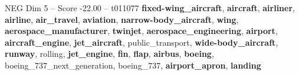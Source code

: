 \begin{textsample}{NEG Dim 5 – Score -22.00 – t011077}  \label{ex:f5_neg_007}
\textbf{fixed-wing\_aircraft}, \textbf{aircraft}, \textbf{airliner}, \textbf{airline}, \textbf{air\_travel}, \textbf{aviation}, \textbf{narrow-body\_aircraft}, \textbf{wing}, \textbf{aerospace\_manufacturer}, \textbf{twinjet}, \textbf{aerospace\_engineering}, \textbf{airport}, \textbf{aircraft\_engine}, \textbf{jet\_aircraft}, public\_transport, \textbf{wide-body\_aircraft}, \textbf{runway}, rolling, \textbf{jet\_engine}, \textbf{fin}, \textbf{flap}, \textbf{airbus}, \textbf{boeing}, boeing\_737\_next\_generation, boeing\_737, \textbf{airport\_apron}, \textbf{landing}

\end{textsample}
